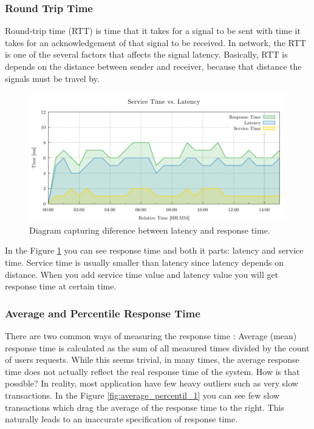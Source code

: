\subsubsection{Round Trip Time}
Round-trip time (RTT) is time that it takes for a signal to be sent with time it takes for an acknowledgement of that signal to be received. In network, the RTT is one of the several factors that affects the signal latency. Basically, RTT is depends on the distance between sender and receiver, because that distance the signals must be travel by.


\begin{figure}[H]
  \centering
  \includegraphics[width=15cm]{obrazky-figures/latency.pdf}
  \caption{Diagram capturing diference between latency and response time.}
  \label{fig:latency_vs_service_time}
\end{figure}

In the Figure \ref{fig:latency_vs_service_time} you can see response time and both it parts: latency and service time. Service time is usually smaller than latency since latency depends on distance. When you add service time value and latency value you will get response time at certain time.

\subsubsection*{Average and Percentile Response Time}
There are two common ways of measuring the response time \cite{Kopp:RPT}: Average (mean) response time is calculated as the sum of all measured times divided by the count of users requests. While this seems trivial, in many times, the average response time does not actually reflect the real response time of the system. How is that possible? In reality, most application have few heavy outliers such as very slow transactions. In the Figure \ref{fig:average_percentil_1} you can see few slow transactions which drag the average of the response time to the right. This naturally leads to an inaccurate specification of response time.


